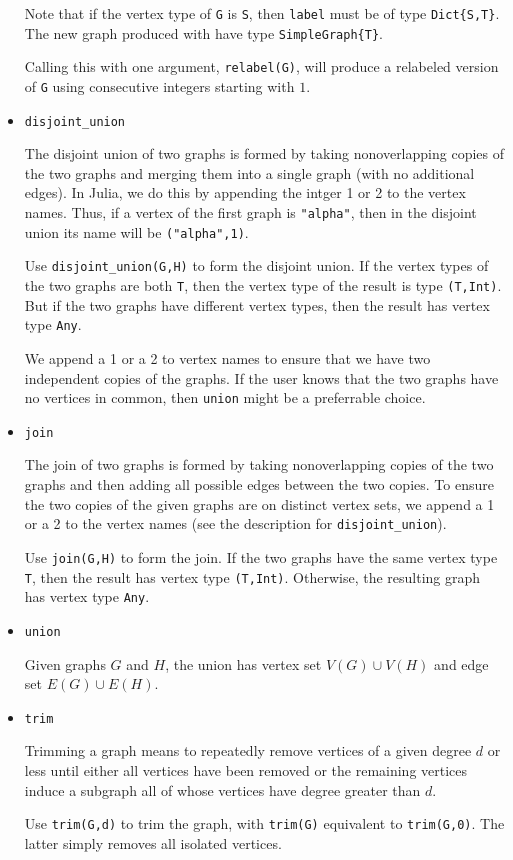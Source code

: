 \documentclass[oneside]{amsart}
\begin{document}
\begin{itemize}
  Note that if the vertex type of \verb|G| is \verb|S|, then
  \verb|label| must be of type \verb|Dict{S,T}|. The new graph
  produced with have type \verb|SimpleGraph{T}|.

  Calling this with one argument, \verb|relabel(G)|, will produce a
  relabeled version of \verb|G| using consecutive integers starting
  with $1$.


\item \verb|disjoint_union|

  The disjoint union of two graphs is formed by taking
  nonoverlapping copies of the two graphs and merging them into a
  single graph (with no additional edges). In Julia, we do this by
  appending the intger 1 or 2 to the vertex names.  Thus, if a vertex
  of the first graph is \verb|"alpha"|, then in the disjoint union its
  name will be \verb|("alpha",1)|.

  Use \verb|disjoint_union(G,H)| to form the disjoint union. If the
  vertex types of the two graphs are both \verb|T|, then the vertex
  type of the result is type \verb|(T,Int)|. But if the two graphs
  have different vertex types, then the result has vertex type
  \verb|Any|.

  We append a 1 or a 2 to vertex names to ensure that we have two
  independent copies of the graphs. If the user knows that the two
  graphs have no vertices in common, then \verb|union| might be a
  preferrable choice.

\item \verb|join|

  The join of two graphs is formed by taking nonoverlapping copies of
  the two graphs and then adding all possible edges between the two
  copies. To ensure the two copies of the given graphs are on distinct
  vertex sets, we append a 1 or a 2 to the vertex names (see the
  description for \verb|disjoint_union|).

  Use \verb|join(G,H)| to form the join. If the two graphs have the
  same vertex type \verb|T|, then the result has vertex type
  \verb|(T,Int)|. Otherwise, the resulting graph has vertex type
  \verb|Any|.

\item \verb|union|

  Given graphs $G$ and $H$, the union has vertex set $V(G)\cup V(H)$
  and edge set $E(G) \cup E(H)$.


\item \verb|trim|

  Trimming a graph means to repeatedly remove vertices of a given
  degree $d$ or less until either all vertices have been removed or the
  remaining vertices induce a subgraph all of whose vertices have
  degree greater than $d$.

  Use \verb|trim(G,d)| to trim the graph, with \verb|trim(G)|
  equivalent to \verb|trim(G,0)|. The latter simply removes all
  isolated vertices.

\end{itemize}
\end{document}
